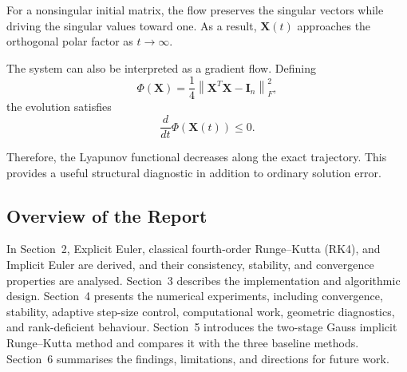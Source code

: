 For a nonsingular initial matrix, the flow preserves the singular
vectors while driving the singular values toward one. As a result,
$\mathbf{X}(t)$ approaches the orthogonal polar factor as
$t\rightarrow\infty$.

The system can also be interpreted as a gradient flow. Defining
\begin{equation}
\label{eq:background_lyapunov}
\Phi(\mathbf{X})
=
\frac14
\left\|
\mathbf{X}^T\mathbf{X}-\mathbf{I}_n
\right\|_F^2,
\end{equation}
the evolution satisfies
\[
\frac{d}{dt}\Phi(\mathbf{X}(t)) \leq 0.
\]

Therefore, the Lyapunov functional decreases along the exact trajectory.
This provides a useful structural diagnostic in addition to ordinary
solution error.

\subsection{Overview of the Report}

In Section~2, Explicit Euler, classical fourth-order Runge--Kutta
(RK4), and Implicit Euler are derived, and their consistency, stability,
and convergence properties are analysed. Section~3 describes the
implementation and algorithmic design. Section~4 presents the numerical
experiments, including convergence, stability, adaptive step-size
control, computational work, geometric diagnostics, and rank-deficient
behaviour. Section~5 introduces the two-stage Gauss implicit Runge--Kutta
method and compares it with the three baseline methods. Section~6
summarises the findings, limitations, and directions for future work.


